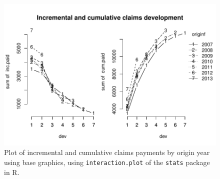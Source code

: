 \documentclass{article}
\begin{document}
\begin{figure}[thb]
  \begin{center}
\includegraphics{Log-incremental-triangleplotinteractionplot}
\caption{Plot of incremental and cumulative claims payments by origin
  year using base graphics, using \texttt{interaction.plot} of the 
  \texttt{stats} package in \textsf{R}.}
\label{fig:triangleinteraction}
\end{center}
\end{figure}
\end{document}
